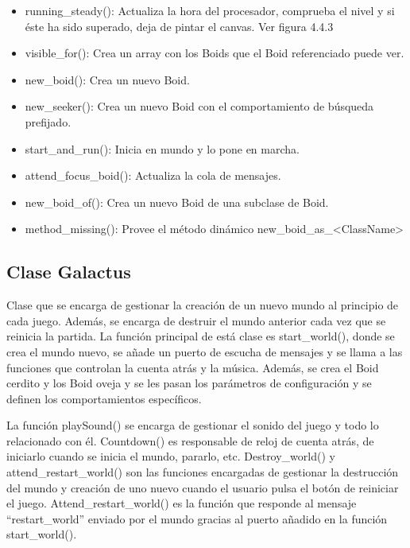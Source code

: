 \begin{itemize}
 \item running\_steady():
Actualiza la hora del procesador, comprueba el nivel y si éste ha sido superado, deja de pintar el canvas. Ver figura 4.4.3

 \item visible\_for():
Crea un array con los Boids que el Boid referenciado puede ver.

 \item new\_boid():
Crea un nuevo Boid.

 \item new\_seeker():
Crea un nuevo Boid con el comportamiento de búsqueda prefijado.

 \item start\_and\_run():
Inicia en mundo y lo pone en marcha.

 \item attend\_focus\_boid():
Actualiza la cola de mensajes.

 \item new\_boid\_of():
Crea un nuevo Boid de una subclase de Boid.

 \item method\_missing():
Provee el método dinámico new\_boid\_as\_<ClassName>
\end{itemize}



\subsection{Clase Galactus}
\label{subsection:galactus}

Clase que se encarga de gestionar la creación de un nuevo mundo al principio de cada juego. Además, se encarga de destruir el mundo 
anterior cada vez que se reinicia la partida. La función principal de está clase es start\_world(), donde se crea el mundo nuevo, se añade 
un puerto de escucha de mensajes y se llama a las funciones que controlan la cuenta atrás y la música. Además, se crea el Boid cerdito y 
los Boid oveja y se les pasan los parámetros de configuración y se definen los comportamientos específicos.

La función playSound() se encarga de gestionar el sonido del juego y todo lo relacionado con él. Countdown() es responsable de reloj de 
cuenta atrás, de iniciarlo cuando se inicia el mundo, pararlo, etc. Destroy\_world() y attend\_restart\_world() son las funciones encargadas 
de gestionar la destrucción del mundo y creación de uno nuevo cuando el usuario pulsa el botón de reiniciar el juego. 
Attend\_restart\_world() es la función que responde al mensaje “restart\_world” enviado por el mundo gracias al puerto añadido en la 
función start\_world().\\

